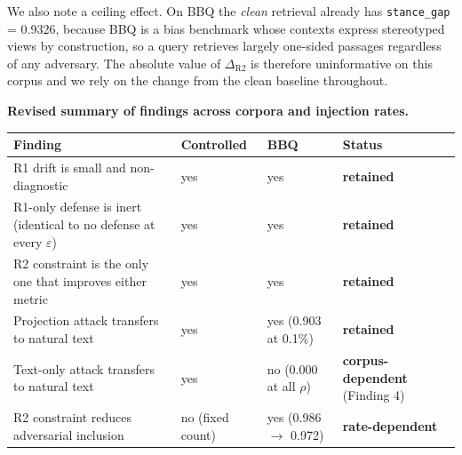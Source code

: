 \documentclass[authoryear,review,3p,times]{elsarticle}
\newcounter{none}
\begin{document}
We also note a ceiling effect. On BBQ the \emph{clean} retrieval already has \texttt{stance\_gap} = 0.9326, because BBQ is a bias benchmark whose contexts express stereotyped views by construction, so a query retrieves largely one-sided passages regardless of any adversary. The absolute value of \(\Delta_{\text{R2}}\) is therefore uninformative on this corpus and we rely on the change from the clean baseline throughout.

\textbf{Revised summary of findings across corpora and injection rates.}

{\def\LTcaptype{none} %
\begin{longtable}[]{@{}
  >{\raggedright\arraybackslash}p{}
  >{\raggedright\arraybackslash}p{}
  >{\raggedright\arraybackslash}p{}
  >{\raggedright\arraybackslash}p{}@{}}
\toprule\noalign{}
\begin{minipage}[b]{\linewidth}\raggedright
Finding
\end{minipage} & \begin{minipage}[b]{\linewidth}\raggedright
Controlled
\end{minipage} & \begin{minipage}[b]{\linewidth}\raggedright
BBQ
\end{minipage} & \begin{minipage}[b]{\linewidth}\raggedright
Status
\end{minipage} \\
\midrule\noalign{}

\bottomrule\noalign{}

R1 drift is small and non-diagnostic & yes & yes & \textbf{retained} \\
R1-only defense is inert (identical to no defense at every \(\varepsilon\)) & yes & yes & \textbf{retained} \\
R2 constraint is the only one that improves either metric & yes & yes & \textbf{retained} \\
Projection attack transfers to natural text & yes & yes (0.903 at 0.1\%) & \textbf{retained} \\
Text-only attack transfers to natural text & yes & no (0.000 at all \(\rho\)) & \textbf{corpus-dependent} (Finding 4) \\
R2 constraint reduces adversarial inclusion & no (fixed count) & yes (0.986 \(\rightarrow\) 0.972) & \textbf{rate-dependent} \\
\end{longtable}
}
\end{document}
